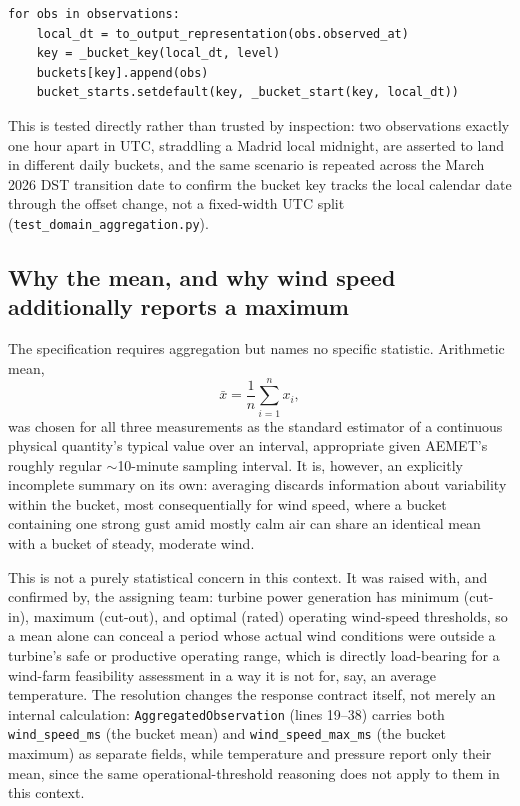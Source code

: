 \documentclass[11pt,a4paper]{article}
\begin{document}
\begin{lstlisting}[caption={Bucket keys are Madrid calendar tuples. \texttt{backend/app/domain/aggregation.py}, lines 100--104.}]
for obs in observations:
    local_dt = to_output_representation(obs.observed_at)
    key = _bucket_key(local_dt, level)
    buckets[key].append(obs)
    bucket_starts.setdefault(key, _bucket_start(key, local_dt))
\end{lstlisting}

This is tested directly rather than trusted by inspection: two
observations exactly one hour apart in UTC, straddling a Madrid local
midnight, are asserted to land in different daily buckets, and the same
scenario is repeated across the March 2026 DST transition date to confirm
the bucket key tracks the local calendar date through the offset change,
not a fixed-width UTC split (\texttt{test\_domain\_aggregation.py}).

\subsection{Why the mean, and why wind speed additionally reports a maximum}

The specification requires aggregation but names no specific statistic.
Arithmetic mean,
\[
\bar{x} = \frac{1}{n}\sum_{i=1}^{n} x_i,
\]
was chosen for all three measurements as the standard estimator of a
continuous physical quantity's typical value over an interval, appropriate
given AEMET's roughly regular $\sim$10-minute sampling interval. It is,
however, an explicitly incomplete summary on its own: averaging discards
information about variability within the bucket, most consequentially for
wind speed, where a bucket containing one strong gust amid mostly calm air
can share an identical mean with a bucket of steady, moderate wind.

This is not a purely statistical concern in this context. It was raised
with, and confirmed by, the assigning team: turbine power generation has
minimum (cut-in), maximum (cut-out), and optimal (rated) operating
wind-speed thresholds, so a mean alone can conceal a period whose actual
wind conditions were outside a turbine's safe or productive operating
range, which is directly load-bearing for a wind-farm feasibility
assessment in a way it is not for, say, an average temperature. The
resolution changes the response contract itself, not merely an internal
calculation: \texttt{AggregatedObservation} (lines 19--38) carries both
\texttt{wind\_speed\_ms} (the bucket mean) and \texttt{wind\_speed\_max\_ms}
(the bucket maximum) as separate fields, while temperature and pressure
report only their mean, since the same operational-threshold reasoning
does not apply to them in this context.
\end{document}
